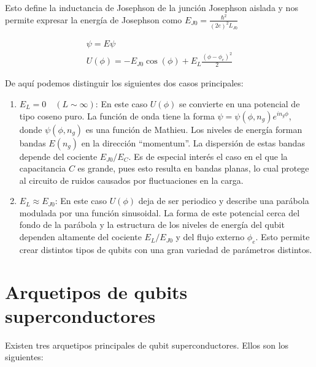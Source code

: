 Esto define la inductancia de Josephson de la junción Josephson aislada y nos permite expresar la energía de Josephson como $E_{J0} = \frac{\hbar^2}{(2e)^2L_{J0}}$

\begin{align}
[E_C (-i\hbar \frac{\partial}{\partial\phi}-n_g)^2 + U(\phi)] \psi = E \psi \\
U(\phi) = -E_{J0} \cos(\phi) + E_L \frac{(\phi-\phi_e)^2}{2}
\end{align}

De aquí podemos distinguir los siguientes dos casos principales:

\begin{enumerate}
    \item $E_L = 0 \quad (L \sim \infty)$: En este caso $U(\phi)$ se convierte en una potencial de tipo coseno puro. La función de onda tiene la forma $\psi = \psi(\phi, n_g) e^{i n_g \phi}$, donde $\psi(\phi, n_g)$ es una función de Mathieu. Los niveles de energía forman bandas $E(n_g)$ en la dirección ``momentum''. La dispersión de estas bandas depende del cociente $E_{J0}/E_C$. Es de especial interés el caso en el que la capacitancia $C$ es grande, pues esto resulta en bandas planas, lo cual protege al circuito de ruidos causados por fluctuaciones en la carga.
    \item $E_L \approx E_{J0}$: En este caso $U(\phi)$ deja de ser periodico y describe una parábola modulada por una función sinusoidal. La forma de este potencial cerca del fondo de la parábola y la estructura de los niveles de energía del qubit dependen altamente del cociente $E_L/E_{J0}$ y del flujo externo $\phi_e$. Esto permite crear distintos tipos de qubits con una gran variedad de parámetros distintos.
\end{enumerate}

\section{Arquetipos de qubits superconductores}

Existen tres arquetipos principales de qubit superconductores. Ellos son los siguientes:

